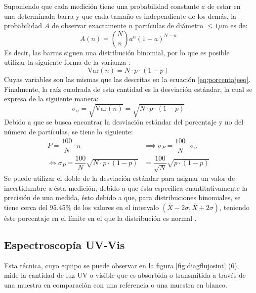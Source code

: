 \documentclass[../main.tex]{subfiles}
\begin{document}
Suponiendo que cada medición tiene una probabilidad constante $a$ de estar en una determinada barra y que cada tamaño es independiente de los demás, la probabilidad $A$ de observar exactamente $n$ partículas de diámetro $\leq 1\mu$m es de:
\begin{equation}
    A(n)=\binom{N}{n}a^n(1-a)^{N-n}
    \label{eq:binomdist}
\end{equation}
Es decir, las barras siguen una distribución binomial, por lo que es posible utilizar la siguiente forma de la varianza \cite{Stephenson2005}:
\begin{equation}
    \text{Var}(n)=N\cdot p\cdot(1-p)
    \label{eq:varianza}
\end{equation}
Cuyas variables son las mismas que las descritas en la ecuación \ref{eq:porcentajeeq}. Finalmente, la raíz cuadrada de esta cantidad es la desviación estándar, la cual se expresa de la siguiente manera:
\begin{equation}
    \sigma_n=\sqrt{\text{Var}(n)}=\sqrt{N\cdot p\cdot(1-p)}
    \label{eq:desviacionsinescalar}
\end{equation}
Debido a que se busca encontrar la desviación estándar del porcentaje y no del número de partículas, se tiene lo siguiente:
\begin{equation}
    \begin{split}
        P=\dfrac{100}{N}\cdot n&\implies\sigma_P=\dfrac{100}{N}\cdot\sigma_n\\
        \iff \sigma_P=\dfrac{100}{N}\sqrt{N\cdot p\cdot(1-p)}&=\dfrac{100}{\sqrt{N}}\sqrt{p\cdot(1-p)}
    \end{split}
    \label{eq:desvest}
\end{equation}
Se puede utilizar el doble de la desviación estándar para asignar un valor de incertidumbre a ésta medición, debido a que ésta especifica cuantitativamente la precisión de una medida, ésto debido a que, para distribuciones binomiales, se tiene cerca del 95.45\% de los valores en el intervalo $(\bar{X}-2\sigma,\bar{X}+2\sigma)$, teniendo éste porcentaje en el límite en el que la distribución es normal \cite{bertaoda}.
\subsection{Espectroscopía UV-Vis}
Esta técnica, cuyo equipo se puede observar en la figura \ref{fig:diagflujosint} (6), mide la cantidad de luz UV o visible que es absorbida o transmitida a través de una muestra en comparación con una referencia o una muestra en blanco.
\end{document}
